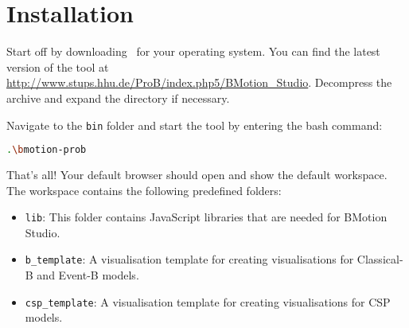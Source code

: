 \section{Installation}
\label{tutorial_02}

Start off by downloading \bms~for your operating system. 
You can find the latest version of the tool at \url{http://www.stups.hhu.de/ProB/index.php5/BMotion_Studio}.
Decompress the archive and expand the directory if necessary. 


Navigate to the \texttt{bin} folder and start the tool by entering the bash command:

\begin{lstlisting}[language=bash]
.\bmotion-prob
\end{lstlisting}


That's all! 
Your default browser should open and show the default workspace.
The workspace contains the following predefined folders:

\begin{itemize}
\item \texttt{lib}: This folder contains JavaScript libraries that are needed for BMotion Studio.
\item \texttt{b\_template}: A visualisation template for creating visualisations for Classical-B and Event-B models.
\item \texttt{csp\_template}: A visualisation template for creating visualisations for CSP models.
\end{itemize}
